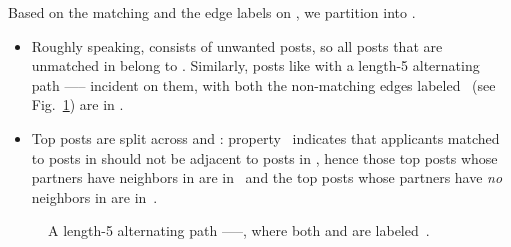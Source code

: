 \documentclass[11pt]{llncs}
\begin{document}
Based on the matching  and the edge labels on , we partition  into 
. 
\begin{itemize}
\item Roughly speaking,  consists of unwanted posts, so
all posts that are unmatched in  belong to . Similarly, posts like  with a
length-5 alternating path ----- incident on them,
with both the non-matching edges labeled~ (see Fig.~\ref{fig:partition}) are in .
\item Top posts are split across  and : property~ indicates
that applicants matched to posts in  should not be adjacent to posts in ,
hence those top posts whose partners have neighbors in  are in~ and
the top posts whose partners have {\em no} neighbors in  are in~.
\end{itemize}

\begin{figure}[h]
\centerline{}
\caption{A length-5 alternating path -----, where both  and  are labeled~.}
\label{fig:partition}
\end{figure}
\end{document}
